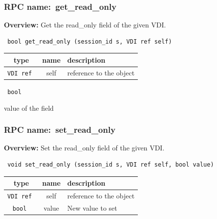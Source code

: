 \vspace{0.3cm}
\vspace{0.3cm}
\vspace{0.3cm}
\subsubsection{RPC name:~get\_read\_only}

{\bf Overview:} 
Get the read\_only field of the given VDI.

\begin{verbatim} bool get_read_only (session_id s, VDI ref self)\end{verbatim}



 
\vspace{0.3cm}
\begin{tabular}{|c|c|p{7cm}|}
 \hline
{\bf type} & {\bf name} & {\bf description} \\ \hline
{\tt VDI ref } & self & reference to the object \\ \hline 

\end{tabular}

\vspace{0.3cm}

{\tt 
bool
}


value of the field
\vspace{0.3cm}
\vspace{0.3cm}
\vspace{0.3cm}
\subsubsection{RPC name:~set\_read\_only}

{\bf Overview:} 
Set the read\_only field of the given VDI.

\begin{verbatim} void set_read_only (session_id s, VDI ref self, bool value)\end{verbatim}



 
\vspace{0.3cm}
\begin{tabular}{|c|c|p{7cm}|}
 \hline
{\bf type} & {\bf name} & {\bf description} \\ \hline
{\tt VDI ref } & self & reference to the object \\ \hline 

{\tt bool } & value & New value to set \\ \hline 

\end{tabular}

